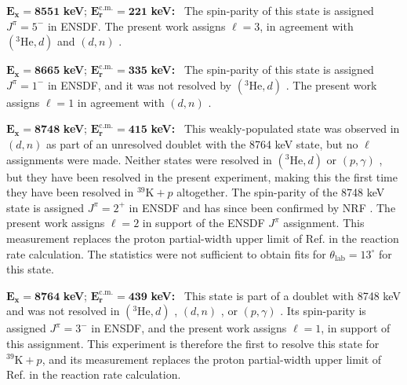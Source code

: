 \emph{$\mathbf{E_{x} = 8551}$} \textbf{keV}; \emph{$\mathbf{E^{\boldsymbol{\mathrm{c.m.}}}_{r} = 221}$} \textbf{keV:} \, 
The spin-parity of this state is assigned $J^{\pi} = 5^{-}$ in ENSDF. The present work assigns $\ell=3$, in agreement with $(^{3}\mathrm{He}, d)$ \cite{Erskine1966,Seth1967,Cage1971} and $(d, n)$ \cite{Fuchs1969}.

\emph{$\mathbf{E_{x} = 8665}$} \textbf{keV}; \emph{$\mathbf{E^{\boldsymbol{\mathrm{c.m.}}}_{r} = 335}$} \textbf{keV:} \, 
The spin-parity of this state is assigned $J^{\pi} = 1^{-}$ in ENSDF, and it was not resolved by $(^{3}\mathrm{He},d)$ \cite{Erskine1966,Seth1967,Cage1971}. The present work assigns $\ell=1$ in agreement with $(d, n)$ \cite{Fuchs1969}.

\emph{$\mathbf{E_{x} = 8748}$} \textbf{keV}; \emph{$\mathbf{E^{\boldsymbol{\mathrm{c.m.}}}_{r} = 415}$} \textbf{keV:} \, 
This weakly-populated state was observed in $(d, n)$ \cite{Fuchs1969} as part of an unresolved doublet with the 8764 keV state, but no $\ell$ assignments were made. Neither states were resolved in $(^{3}\mathrm{He},d)$ \cite{Erskine1966,Seth1967,Cage1971} or $(p,\gamma)$ \cite{Kikstra1990,Cheng1981,Leenhouts1966}, but they have been resolved in the present experiment, making this the first time they have been resolved in $^{39}\mathrm{K}+p$ altogether. The spin-parity of the 8748 keV state is assigned $J^{\pi} = 2^{+}$ in ENSDF and has since been confirmed by NRF \cite{Gribble2022}. The present work assigns $\ell=2$ in support of the ENSDF $J^{\pi}$ assignment. This measurement replaces the proton partial-width upper limit of Ref. \cite{Longland2018} in the reaction rate calculation. The statistics were not sufficient to obtain fits for $\theta_{\mathrm{lab}} = 13^{\circ}$ for this state.

\emph{$\mathbf{E_{x} = 8764}$} \textbf{keV}; \emph{$\mathbf{E^{\boldsymbol{\mathrm{c.m.}}}_{r} = 439}$} \textbf{keV:} \, 
This state is part of a doublet with 8748 keV and was not resolved in $(^{3}\mathrm{He},d)$ \cite{Erskine1966,Seth1967,Cage1971}, $(d, n)$ \cite{Fuchs1969}, or $(p,\gamma)$ \cite{Kikstra1990,Cheng1981,Leenhouts1966}. Its spin-parity is assigned $J^{\pi} = 3^{-}$ in ENSDF, and the present work assigns $\ell=1$, in support of this assignment. This experiment is therefore the first to resolve this state for $^{39}\mathrm{K}+p$, and its measurement replaces the proton partial-width upper limit of Ref. \cite{Longland2018} in the reaction rate calculation.

